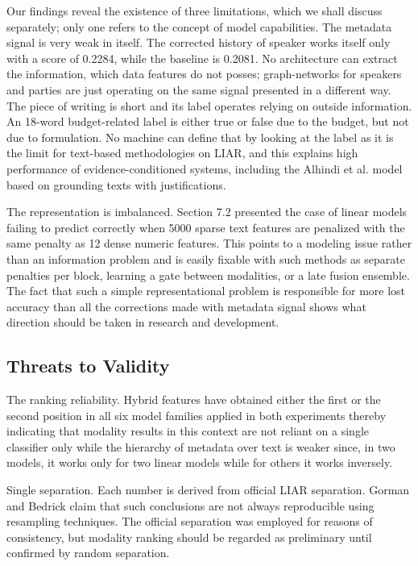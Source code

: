Our findings reveal the existence of three limitations, which we shall discuss separately; only one refers to the concept of model capabilities. The metadata signal is very weak in itself. The corrected history of speaker works itself only with a score of 0.2284, while the baseline is 0.2081. No architecture can extract the information, which data features do not posses; graph-networks for speakers and parties are just operating on the same signal presented in a different way. The piece of writing is short and its label operates relying on outside information. An 18-word budget-related label is either true or false due to the budget, but not due to formulation. No machine can define that by looking at the label as it is the limit for text-based methodologies on LIAR, and this explains high performance of evidence-conditioned systems, including the Alhindi et al. model based on grounding texts with justifications.

The representation is imbalanced. Section 7.2 presented the case of linear models failing to predict correctly when 5000 sparse text features are penalized with the same penalty as 12 dense numeric features. This points to a modeling issue rather than an information problem and is easily fixable with such methods as separate penalties per block, learning a gate between modalities, or a late fusion ensemble. The fact that such a simple representational problem is responsible for more lost accuracy than all the corrections made with metadata signal shows what direction should be taken in research and development.

\subsection{Threats to Validity}

The ranking reliability. Hybrid features have obtained either the first or the second position in all six model families applied in both experiments thereby indicating that modality results in this context are not reliant on a single classifier only while the hierarchy of metadata over text is weaker since, in two models, it works only for two linear models while for others it works inversely.

Single separation. Each number is derived from official LIAR separation. Gorman and Bedrick \cite{gorman2019standard} claim that such conclusions are not always reproducible using resampling techniques. The official separation was employed for reasons of consistency, but modality ranking should be regarded as preliminary until confirmed by random separation.

